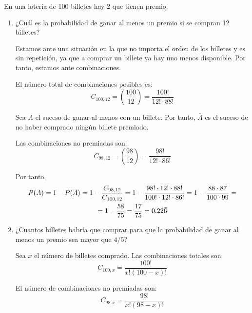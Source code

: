 \begin{ejercicio} \label{ej:3.Ejercicio6}
    En una lotería de 100 billetes hay 2 que tienen premio.
    \begin{enumerate}
        \item ¿Cuál es la probabilidad de ganar al menos un premio si se compran 12 billetes?

        Estamos ante una situación en la que no importa el orden de los billetes y es sin repetición, ya que a comprar un billete ya hay uno menos disponible. Por tanto, estamos ante combinaciones.

        El número total de combinaciones posibles es:
        \begin{equation*}
            C_{100, 12} = \binom{100}{12} = \frac{100!}{12! \cdot 88!}
        \end{equation*}

        Sea $A$ el suceso de ganar al menos con un billete. Por tanto, $\bar{A}$ es el suceso de no haber comprado ningún billete premiado.
        
        Las combinaciones no premiadas son:
        \begin{equation*}
            C_{98,12} = \binom{98}{12} = \frac{98!}{12!\cdot 86!}
        \end{equation*}
        
        Por tanto,
        \begin{multline*}
            P(A)=1-P(\bar{A}) = 1-\frac{C_{98,12}}{C_{100,12}} = 1-\frac{98! \cdot 12!\cdot 88!}{100!\cdot 12!\cdot 86!}
            = 1-\frac{88\cdot 87}{100\cdot 99} =\\= 1-\frac{58}{75} = \frac{17}{75} = 0.22\Bar{6}
        \end{multline*}

        
        \item ¿Cuantos billetes habría que comprar para que la probabilidad de ganar al menos un premio sea mayor que $4/5$?

        Sea $x$ el número de billetes comprado.
        Las combinaciones totales son:
        \begin{equation*}
            C_{100,x}=\frac{100!}{x!(100-x)!}
        \end{equation*}

        El número de combinaciones no premiadas son:
        \begin{equation*}
            C_{98,x}=\frac{98!}{x!(98-x)!}
        \end{equation*}


\end{enumerate}
\end{ejercicio}
